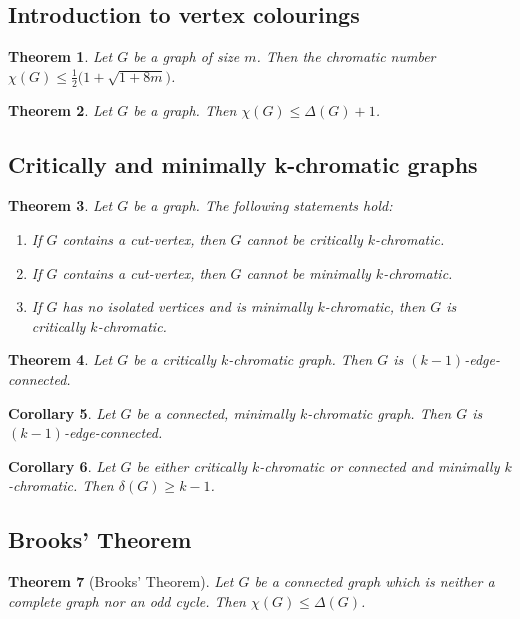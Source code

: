 \documentclass{article}
\newtheorem{theorem}{Theorem}[section]
\newtheorem{corollary}[theorem]{Corollary}
\begin{document}
\subsection{Introduction to vertex colourings}
\begin{theorem}
Let $G$ be a graph of size $m$. Then the chromatic number $\chi(G)\le \tfrac12\bigl(1+\sqrt{1+8m}\bigr)$.
\end{theorem}

\begin{theorem}
Let $G$ be a graph. Then $\chi(G)\le \Delta(G)+1$.
\end{theorem}

\subsection{Critically and minimally k-chromatic graphs}
\begin{theorem}
Let $G$ be a graph. The following statements hold:
\begin{enumerate}
\item If $G$ contains a cut-vertex, then $G$ cannot be critically $k$-chromatic.
\item If $G$ contains a cut-vertex, then $G$ cannot be minimally $k$-chromatic.
\item If $G$ has no isolated vertices and is minimally $k$-chromatic, then $G$ is critically $k$-chromatic.
\end{enumerate}
\end{theorem}

\begin{theorem}
Let $G$ be a critically $k$-chromatic graph. Then $G$ is $(k-1)$-edge-connected.
\end{theorem}

\begin{corollary}
Let $G$ be a connected, minimally $k$-chromatic graph. Then $G$ is $(k-1)$-edge-connected.
\end{corollary}

\begin{corollary}
Let $G$ be either critically $k$-chromatic or connected and minimally $k$-chromatic. Then $\delta(G)\ge k-1$.
\end{corollary}

\subsection{Brooks' Theorem}
\begin{theorem}[Brooks' Theorem]
Let $G$ be a connected graph which is neither a complete graph nor an odd cycle. Then $\chi(G)\le \Delta(G)$.
\end{theorem}
\end{document}
